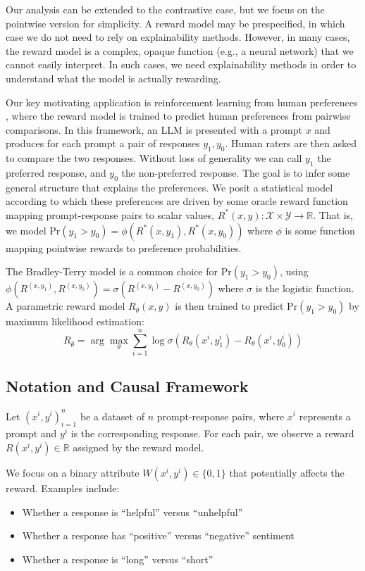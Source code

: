 Our analysis can be extended to the contrastive case, but we focus on the pointwise version for simplicity. A reward model may be prespecified, in which case we do not need to rely on explainability methods. However, in many cases, the reward model is a complex, opaque function (e.g., a neural network) that we cannot easily interpret. In such cases, we need explainability methods in order to understand what the model is actually rewarding.

Our key motivating application is reinforcement learning from human preferences \cite{christiano2017deep}, where the reward model is trained to predict human preferences from pairwise comparisons. In this framework, an LLM is presented with a prompt $x$ and produces for each prompt a pair of responses $y_1, y_0$. Human raters are then asked to compare the two responses. Without loss of generality we can call $y_1$ the preferred response, and $y_0$ the non-preferred response. The goal is to infer some general structure that explains the preferences. We posit a statistical model according to which these preferences are driven by some oracle reward function mapping prompt-response pairs to scalar values, $R^*(x, y): \mathcal{X} \times \mathcal{Y} \to \mathbb{R}$. That is, we model $\text{Pr}(y_1 > y_0) = \phi(R^*(x, y_1), R^*(x, y_0))$ where $\phi$ is some function mapping pointwise rewards to preference probabilities.

The Bradley-Terry model is a common choice for $\text{Pr}(y_1 > y_0)$, using $\phi(R^(x, y_1), R^(x, y_0)) = \sigma(R^(x, y_1) - R^(x, y_0))$ where $\sigma$ is the logistic function. A parametric reward model $R_\theta(x, y)$ is then trained to predict $\text{Pr}(y_1 > y_0)$ by maximum likelihood estimation:
\begin{equation*}
R_{\hat\theta} = \arg \max_\theta \sum_{i=1}^n \log \sigma(R_\theta(x^i, y_1^i) - R_\theta(x^i, y_0^i))
\end{equation*}

\subsection{Notation and Causal Framework}
Let ${(x^i, y^i)}_{i=1}^n$ be a dataset of $n$ prompt-response pairs, where $x^i$ represents a prompt and $y^i$ is the corresponding response. For each pair, we observe a reward $R(x^i, y^i) \in \mathbb{R}$ assigned by the reward model.

We focus on a binary attribute $W(x^i, y^i) \in \{0,1\}$ that potentially affects the reward. Examples include:
\begin{itemize}
\item Whether a response is ``helpful'' versus ``unhelpful''
\item Whether a response has ``positive'' versus ``negative'' sentiment
\item Whether a response is ``long'' versus ``short''
\end{itemize}

